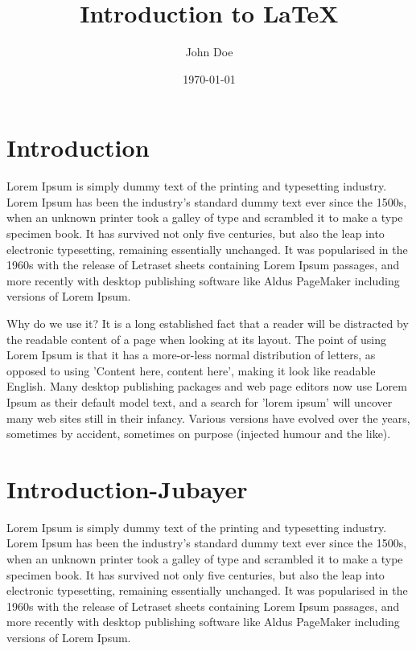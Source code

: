 \documentclass[12pt, a4paper]{article}
\title{Introduction to {\LaTeX}}
\author{John Doe}
\date{\today}
\begin{document}
	\maketitle 

\section{Introduction}
Lorem Ipsum is simply dummy text of the printing and typesetting industry. 
Lorem Ipsum has been the industry's standard dummy text ever since the 1500s, 
when an unknown printer took a galley of type and scrambled it to make a type 
specimen book. It has survived not only five centuries, but also the leap into 
electronic typesetting, remaining essentially unchanged. It was popularised in 
the 1960s with the release of Letraset sheets containing Lorem Ipsum passages, 
and more recently with desktop publishing software like Aldus PageMaker 
including versions of Lorem Ipsum.

Why do we use it?
It is a long established fact that a reader will be distracted by the readable 
content of a page when looking at its layout. The point of using Lorem Ipsum is 
that it has a more-or-less normal distribution of letters, as opposed to using 
'Content here, content here', making it look like readable English. Many 
desktop publishing packages and web page editors now use Lorem Ipsum as their 
default model text, and a search for 'lorem ipsum' will uncover many web sites 
still in their infancy. Various versions have evolved over the years, sometimes 
by accident, sometimes on purpose (injected humour and the like).

\section{Introduction-Jubayer}
Lorem Ipsum is simply dummy text of the printing and typesetting industry.
Lorem Ipsum has been the industry's standard dummy text ever since the 1500s,
when an unknown printer took a galley of type and scrambled it to make a type
specimen book. It has survived not only five centuries, but also the leap into
electronic typesetting, remaining essentially unchanged. It was popularised in
the 1960s with the release of Letraset sheets containing Lorem Ipsum passages,
and more recently with desktop publishing software like Aldus PageMaker
including versions of Lorem Ipsum.



	
\end{document}
